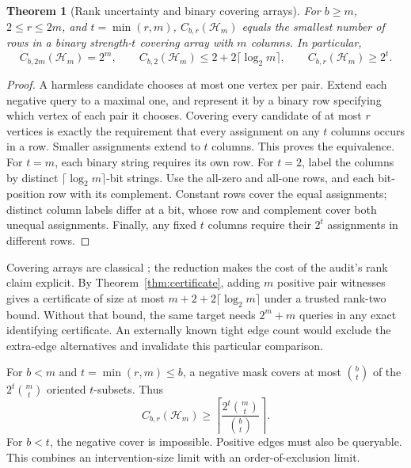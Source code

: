 \documentclass[10pt]{article}
\newtheorem{theorem}{Theorem}
\theoremstyle{definition}\newtheorem{definition}[theorem]{Definition}
\newcommand{\HH}{\mathcal H}
\begin{document}
\begin{theorem}[Rank uncertainty and binary covering arrays]\label{thm:rankgap}
For $b\ge m$, $2\le r\le2m$, and $t=\min(r,m)$, $C_{b,r}(\HH_m)$ equals the smallest
number of rows in a binary strength-$t$ covering array with $m$ columns. In particular,
\begin{equation}
 C_{b,2m}(\HH_m)=2^m,\qquad
 C_{b,2}(\HH_m)\le2+2\lceil\log_2m\rceil,\qquad C_{b,r}(\HH_m)\ge2^t.
 \label{eq:rankgap}
\end{equation}
\end{theorem}
\begin{proof}
A harmless candidate chooses at most one vertex per pair. Extend each negative
query to a maximal one, and represent it by a binary row specifying which vertex
of each pair it chooses. Covering every candidate of at most $r$ vertices is exactly
the requirement that every assignment on any $t$ columns occurs in a row. Smaller
assignments extend to $t$ columns. This proves the equivalence.
For $t=m$, each binary string requires its own row. For $t=2$, label the columns
by distinct $\lceil\log_2m\rceil$-bit strings. Use the all-zero and all-one rows,
and each bit-position row with its complement. Constant rows cover the equal
assignments; distinct column labels differ at a bit, whose row and complement
cover both unequal assignments. Finally, any fixed $t$ columns require their
$2^t$ assignments in different rows.
\end{proof}
Covering arrays are classical \citep{colbourn2004}; the reduction makes the cost of
the audit's rank claim explicit. By Theorem~\ref{thm:certificate}, adding $m$ positive
pair witnesses gives a certificate of size at most $m+2+2\lceil\log_2m\rceil$ under a
trusted rank-two bound. Without that bound, the same target needs $2^m+m$ queries
in any exact identifying certificate. An externally known tight edge count would
exclude the extra-edge alternatives and invalidate this particular comparison.

For $b<m$ and $t=\min(r,m)\le b$, a negative mask covers at most $\binom bt$ of the
$2^t\binom mt$ oriented $t$-subsets. Thus
\begin{equation}
 C_{b,r}(\HH_m)\ge\left\lceil\frac{2^t\binom mt}{\binom bt}\right\rceil.
\end{equation}
For $b<t$, the negative cover is impossible. Positive edges must also be queryable.
This combines an intervention-size limit with an order-of-exclusion limit.
\end{document}
